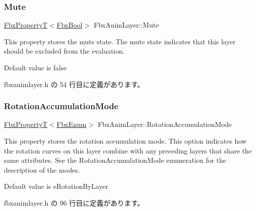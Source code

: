 \mbox{\label{class_fbx_anim_layer_ae8f8f6db5f57e41d42935720b4e8d582}} 
\subsubsection{\texorpdfstring{Mute}{Mute}}
{\footnotesize\ttfamily \hyperlink{class_fbx_property_t}{Fbx\+PropertyT}$<$\hyperlink{fbxtypes_8h_a92e0562b2fe33e76a242f498b362262e}{Fbx\+Bool}$>$ Fbx\+Anim\+Layer\+::\+Mute}

This property stores the mute state. The mute state indicates that this layer should be excluded from the evaluation.

Default value is {\ttfamily false} 

 fbxanimlayer.\+h の 54 行目に定義があります。

\mbox{\label{class_fbx_anim_layer_ae8d47b5fabab90773e9a40aeef934945}} 
\subsubsection{\texorpdfstring{Rotation\+Accumulation\+Mode}{RotationAccumulationMode}}
{\footnotesize\ttfamily \hyperlink{class_fbx_property_t}{Fbx\+PropertyT}$<$\hyperlink{fbxtypes_8h_a9a28614cb4272a0ad7d748eda7f3d3e5}{Fbx\+Enum}$>$ Fbx\+Anim\+Layer\+::\+Rotation\+Accumulation\+Mode}

This property stores the rotation accumulation mode. This option indicates how the rotation curves on this layer combine with any preceding layers that share the same attributes. See the Rotation\+Accumulation\+Mode enumeration for the description of the modes.

Default value is {\ttfamily e\+Rotation\+By\+Layer} 

 fbxanimlayer.\+h の 96 行目に定義があります。

\mbox{\label{class_fbx_anim_layer_a50ec8bebaa1241cc168fae6bcf5c670f}} 
